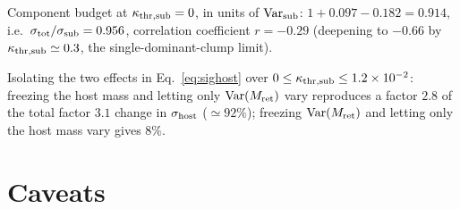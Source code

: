 \documentclass[11pt]{article}
\newcommand{\kthrs}{\kappa_{\rm thr,sub}}
\newcommand{\Mret}{M_{\rm ret}}
\begin{document}
\noindent Component budget at $\kthrs=0$, in units of ${\rm Var}_{\rm sub}$:
$1+0.097-0.182=0.914$, i.e.\ $\sigma_{\rm tot}/\sigma_{\rm sub}=0.956$, correlation
coefficient $r=-0.29$ (deepening to $-0.66$ by $\kthrs\simeq0.3$, the single-dominant-clump
limit).

\noindent Isolating the two effects in Eq.~\eqref{eq:sighost} over $0\le\kthrs\le1.2\times
10^{-2}$: freezing the host mass and letting only ${\rm Var}(\Mret)$ vary reproduces a factor
$2.8$ of the total factor $3.1$ change in $\sigma_{\rm host}$ ($\simeq92\%$); freezing
${\rm Var}(\Mret)$ and letting only the host mass vary gives $8\%$.

\section{Caveats}
\end{document}
